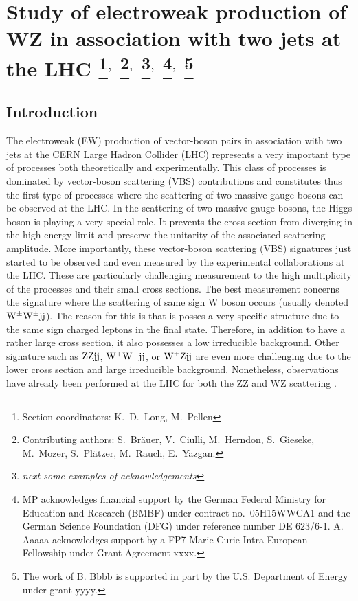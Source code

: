 \documentclass[11pt]{cernrep}
\newcommand{\MP}[1]{{ {\color{blue}{ [MP: #1]}} }}
\begin{document}
\section{Study of electroweak production of WZ in association with two
  jets at the LHC \protect\footnote{Section
    coordinators: K.~D.~Long, M.~Pellen}$^{,}$ \protect\footnote{Contributing authors:
    S.~Br\"auer, V.~Ciulli, M.~Herndon, S.~Gieseke, M.~Mozer, S.~Pl{\"a}tzer,
    M.~Rauch, E.~Yazgan.}$^{,}$
  \protect\footnote{{\it next some examples of acknowledgements}}$^{,}$
  \protect\footnote{MP acknowledges financial support by the
German Federal Ministry for Education and Research (BMBF) under
contract no.~05H15WWCA1 and the German Science Foundation (DFG) under
reference number DE 623/6-1. A. Aaaaa acknowledges support by a FP7 Marie
    Curie Intra European Fellowship under Grant Agreement xxxx.}$^{,}$
\protect\footnote{The work of B. Bbbb is supported in part by the
  U.S. Department of Energy under grant yyyy.} \label{vbs_section}}

\subsection{Introduction \label{vbs_intro}}

The electroweak (EW) production of vector-boson pairs in association with two jets at the CERN Large Hadron Collider (LHC) represents a very important type of processes both theoretically and experimentally.
This class of processes is dominated by vector-boson scattering (VBS) contributions and constitutes thus the first type of processes where the scattering of two massive gauge bosons can be observed at the LHC.
In the scattering of two massive gauge bosons, the Higgs boson is playing a very special role.
It prevents the cross section from diverging in the high-energy limit and preserve the unitarity of the associated scattering amplitude.
More importantly, these vector-boson scattering (VBS) signatures just started to be observed and even measured by the experimental collaborations at the LHC.
These are particularly challenging measurement to the high multiplicity of the processes and their small cross sections.
The best measurement \cite{Aad:2014zda,Khachatryan:2014sta,Sirunyan:2017ret,Aaboud:2016ffv} concerns the signature where the scattering of same sign W boson occurs (usually denoted ${\rm W}^\pm{\rm W}^\pm{\rm j}{\rm j}$).
The reason for this is that is posses a very specific structure due to the same sign charged leptons in the final state.
Therefore, in addition to have a rather large cross section, it also possesses a low irreducible background.
Other signature such as ${\rm Z}{\rm Z}{\rm j}{\rm j}$, ${\rm W}^+{\rm W}^-{\rm j}{\rm j}$, or ${\rm W}^{\pm}{\rm Z}{\rm j}{\rm j}$ are even more challenging due to the lower cross section and large irreducible background.
Nonetheless, observations have already been performed at the LHC for both the ZZ \cite{CMS-PAS-SMP-16-019} and WZ \cite{Aad:2016ett} scattering \MP{Experimental references to be added/modified.}.
\end{document}
